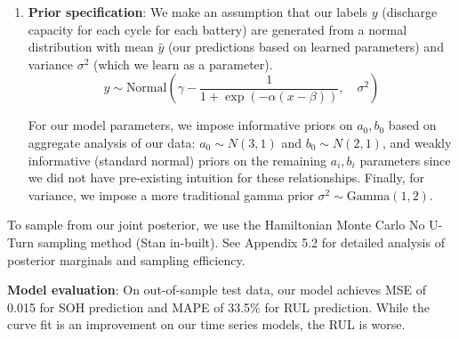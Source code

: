 \documentclass{article}
\begin{document}
\begin{enumerate}[label=(\alph*), leftmargin=.35in]
    \item \textbf{Prior specification}: We make an assumption that our labels $y$ (discharge capacity for each cycle for each battery) are generated from a normal distribution with mean $\hat{y}$ (our predictions based on learned parameters) and variance $\sigma^2$ (which we learn as a parameter).
    $$ y \sim \text{Normal}\left(\gamma - \frac{1}{1+\exp(-\alpha(x-\beta))}, \quad \sigma^2\right)$$

    For our model parameters, we impose informative priors on $a_0, b_0$ based on aggregate analysis of our data: $a_0 \sim N(3,1)$ and $b_0 \sim N(2,1)$, and weakly informative (standard normal) priors on the remaining $a_i, b_i$ parameters since we did not have pre-existing intuition for these relationships. Finally, for variance, we impose a more traditional gamma prior $\sigma^2 \sim \text{Gamma}(1, 2)$.

\end{enumerate}

To sample from our joint posterior, we use the Hamiltonian Monte Carlo No U-Turn sampling method (Stan in-built). See Appendix 5.2 for detailed analysis of posterior marginals and sampling efficiency. \newline

\textbf{Model evaluation}: On out-of-sample test data, our model achieves MSE of 0.015 for SOH prediction and MAPE of 33.5\% for RUL prediction. While the curve fit is an improvement on our time series models, the RUL is worse.
\end{document}
